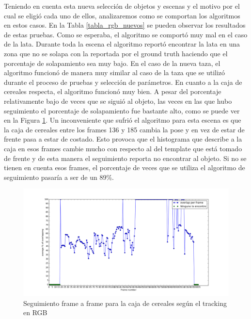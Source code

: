 Teniendo en cuenta esta nueva selección de objetos y escenas y el motivo por el cual se eligió cada uno de ellos, analizaremos como se comportan los algoritmos en estos casos. En la Tabla \ref{tabla_rgb_nuevos} se pueden observar los resultados de estas pruebas. Como se esperaba, el algoritmo se comportó muy mal en el caso de la lata. Durante toda la escena el algoritmo reportó encontrar la lata en una zona que no se solapa con la reportada por el ground truth haciendo que el porcentaje de solapamiento sea muy bajo. En el caso de la nueva taza, el algoritmo funcionó de manera muy similar al caso de la taza que se utilizó durante el proceso de pruebas y selección de parámetros. En cuanto a la caja de cereales respecta, el algoritmo funcionó muy bien. A pesar del porcentaje relativamente bajo de veces que se siguió al objeto, las veces en las que hubo seguimiento el porcentaje de solapamiento fue bastante alto, como se puede ver en la Figura \ref{frame_frame_rgb_nuevo}. Un inconveniente que sufrió el algoritmo para esta escena es que la caja de cereales entre los frames 136 y 185 cambia la pose y en vez de estar de frente pasa a estar de costado. Esto provoca que el histograma que describe a la caja en esos frames cambie mucho con respecto al del template que está tomado de frente y de esta manera el seguimiento reporta no encontrar al objeto. Si no se tienen en cuenta esos frames, el porcentaje de veces que se utiliza el algoritmo de seguimiento pasaría a ser de un 89\%.

\begin{figure}
	\centering
	\includegraphics[width=\textwidth]{img/frame_a_frame/rgb-caja.png}
	\caption{Seguimiento frame a frame para la caja de cereales según el tracking en RGB}
	\label{frame_frame_rgb_nuevo}
\end{figure}



